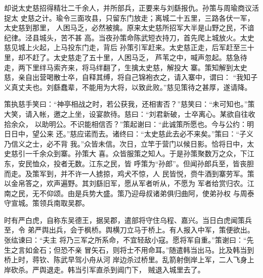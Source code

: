 却说太史慈招得精壮二千余人，并所部兵，正要来与刘繇报仇。孙策与周瑜商议活捉太
史慈之计。瑜令三面攻县，只留东门放走；离城二十五里，三路各伏一军，太史慈到那里，
人困马乏，必然被擒。原来太史慈所招军大半是山野之民，不谙纪律。泾县城头，苦不甚
高。当夜孙策命陈武短衣持刀，首先爬上城放火。太史慈见城上火起，上马投东门走，背后
孙策引军赶来。太史慈正走，后军赶至三十里，却不赶了。太史慈走了五十里，人困马乏，
芦苇之中，喊声忽起。慈急待走，两下里绊马索齐来，将马绊翻了，生擒太史慈，解投大
寨。策知解到太史慈，亲自出营喝散士卒，自释其缚，将自己锦袍衣之，请入寨中，谓曰：
“我知子义真丈夫也。刘繇蠢辈，不能用为大将，以致此败。”慈见策待之甚厚，遂请降。

策执慈手笑曰：“神亭相战之时，若公获我，还相害否？”慈笑曰：“未可知也。”策
大笑，请入帐，邀之上坐，设宴款待。慈曰：“刘君新破，士卒离心。某欲自往收拾余众，
以助明公。不识能相信否？”策起谢曰：“此诚策所愿也。今与公约：明日日中，望公来
还。”慈应诺而去。诸终曰：“太史慈此去必不来矣。”策曰：“子义乃信义之士，必不背
我。”众皆未信。次日，立竿于营门以候日影。恰将日中，太史慈引一千余众到寨。孙策大
喜。众皆服策之知人。于是孙策聚数万之众，下江东，安民恤众，投者无数。江东之民，皆
呼策为“孙郎”。但闻孙郎兵至，皆丧胆而走。及策军到，并不许一人掳掠，鸡犬不惊，人
民皆悦，赍牛酒到寨劳军。策以金帛答之，欢声遍野。其刘繇旧军，愿从军者听从，不愿为
军者给赏归农。江南之民，无不仰颂。由是兵势大盛。策乃迎母叔诸弟俱归曲阿，使弟孙权
与周泰守宣城。策领兵南取吴郡。

时有严白虎，自称东吴德王，据吴郡，遣部将守住乌程、嘉兴。当日白虎闻策兵至，令
弟严舆出兵，会于枫桥。舆横刀立马于桥上。有人报入中军，策便欲出。张纮谏曰：“夫主
将乃三军之所系命，不宜轻敌小寇。愿将军自重。”策谢曰：“先生之言如金石；但恐不亲
冒矢石，则将士不用命耳。”随遣韩当出马。比及韩当到桥上时，蒋钦、陈武早驾小舟从河
岸边杀过桥里。乱箭射倒岸上军，二人飞身上岸砍杀。严舆退走。韩当引军直杀到阊门下，
贼退入城里去了。

